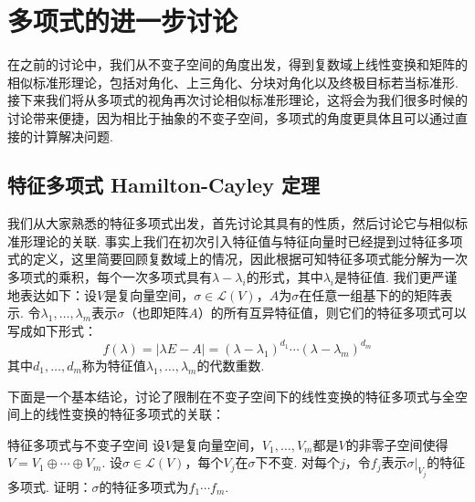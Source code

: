 \chapter{多项式的进一步讨论}

在之前的讨论中，我们从不变子空间的角度出发，得到复数域上线性变换和矩阵的相似标准形理论，包括对角化、上三角化、分块对角化以及终极目标若当标准形. 接下来我们将从多项式的视角再次讨论相似标准形理论，这将会为我们很多时候的讨论带来便捷，因为相比于抽象的不变子空间，多项式的角度更具体且可以通过直接的计算解决问题.

\section{特征多项式 \quad Hamilton-Cayley 定理}

我们从大家熟悉的特征多项式出发，首先讨论其具有的性质，然后讨论它与相似标准形理论的关联. 事实上我们在初次引入特征值与特征向量时已经提到过特征多项式的定义，这里简要回顾复数域上的情况，因此根据可知特征多项式能分解为一次多项式的乘积，每个一次多项式具有$\lambda-\lambda_i$的形式，其中$\lambda_i$是特征值. 我们更严谨地表达如下：设$V$是复向量空间，$\sigma\in \mathcal{L}(V)$，$A$为$\sigma$在任意一组基下的的矩阵表示. 令$\lambda_1,\ldots,\lambda_m$表示$\sigma$（也即矩阵$A$）的所有互异特征值，则它们的特征多项式可以写成如下形式：
\begin{equation}\label{eq:18:特征多项式}
    f(\lambda)=|\lambda E-A|=(\lambda-\lambda_1)^{d_1}\cdots(\lambda-\lambda_m)^{d_m}
\end{equation}
其中$d_1,\ldots,d_m$称为特征值$\lambda_1,\ldots,\lambda_m$的代数重数.

下面是一个基本结论，讨论了限制在不变子空间下的线性变换的特征多项式与全空间上的线性变换的特征多项式的关联：
\begin{theorem}{}{特征多项式与不变子空间}
    设$V$是复向量空间，$V_1,\ldots,V_m$都是$V$的非零子空间使得$V=V_1\oplus\cdots\oplus V_m$. 设$\sigma\in \mathcal{L}(V)$，每个$V_j$在$\sigma$下不变. 对每个$j$，令$f_j$表示$\sigma\vert_{V_j}$的特征多项式. 证明：$\sigma$的特征多项式为$f_1\cdots f_m$.
\end{theorem}

